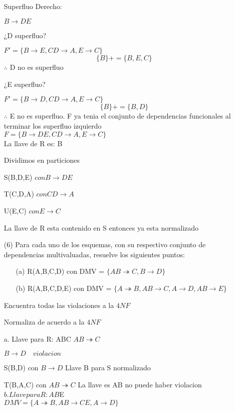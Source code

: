 \documentclass{article}
\begin{document}
\begin{enumerate}
    Superfluo Derecho:

    $B \rightarrow DE$

    ¿D superfluo?

    $F'=\{B \rightarrow E, CD \rightarrow A, E\rightarrow C\}$\\
    $$\{ B\}+=\{ B,E,C\}$$
    $\therefore$ D no es superfluo

    ¿E superfluo?

    $F'=\{ B \rightarrow D, CD \rightarrow A, E \rightarrow C\}$\\
    $$\{ B\}+=\{ B,D\}$$
    $\therefore$ E no es superfluo.
    F ya tenia el conjunto de dependencias funcionales al terminar los superfluo izquierdo\\
    
     $F=\{B \rightarrow DE, CD \rightarrow A, E \rightarrow C\}$\\

    La llave de R es: B

    Dividimos en particiones

    S(B,D,E) $con B \rightarrow DE$

    T(C,D,A) $con CD \rightarrow A$

    U(E,C) $con E \rightarrow C$

    La llave de R esta contenido en S entonces ya esta normalizado



    \item[(6)] Para cada uno de los esquemas, con su respectivo conjunto de dependencias multivaluadas,
    resuelve los siguientes puntos:
    \begin{enumerate}
      \item[(a)] R(A,B,C,D) con DMV = $ \{ AB \twoheadrightarrow C, B
      \rightarrow D \} $
      \item[(b)] R(A,B,C,D,E) con DMV = $\{ A \twoheadrightarrow B, AB
      \rightarrow C, A \rightarrow D, AB \rightarrow E\}$
    \end{enumerate}
    Encuentra todas las violaciones a la $4NF$

    Normaliza de acuerdo a la $4NF$

    a. Llave para R: ABC
    $AB\twoheadrightarrow C$

    $B\rightarrow D \quad violacion$

    S(B,D) con $B \rightarrow D$ Llave B para S normalizado

    T(B,A,C) con $AB\twoheadrightarrow C$ La llave es AB no puede haber violacion\\
    $b. Llave para R: AB$E\\
    $DMV= \{A \twoheadrightarrow B, AB\rightarrow CE,  A\rightarrow D \}$


\end{enumerate}
\end{document}

